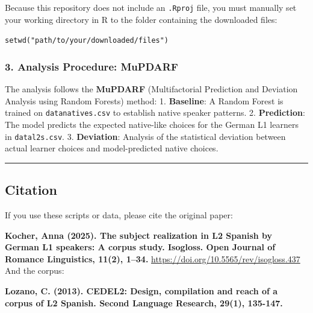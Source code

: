 \documentclass[
  letterpaper,
  DIV=11,
  numbers=noendperiod]{scrartcl}
\begin{document}
Because this repository does not include an \texttt{.Rproj} file, you
must manually set your working directory in R to the folder containing
the downloaded files:

\texttt{setwd("path/to/your/downloaded/files")}

\subsubsection{3. Analysis Procedure:
MuPDARF}\label{analysis-procedure-mupdarf}

The analysis follows the \textbf{MuPDARF} (Multifactorial Prediction and
Deviation Analysis using Random Forests) method: 1. \textbf{Baseline}: A
Random Forest is trained on \texttt{datanatives.csv} to establish native
speaker patterns. 2. \textbf{Prediction}: The model predicts the
expected native-like choices for the German L1 learners in
\texttt{datal2s.csv}. 3. \textbf{Deviation}: Analysis of the statistical
deviation between actual learner choices and model-predicted native
choices.

\begin{center}\rule{0.5\linewidth}{0.5pt}\end{center}

\subsection{Citation}\label{citation}

If you use these scripts or data, please cite the original paper:

\textbf{Kocher, Anna (2025). The subject realization in L2 Spanish by
German L1 speakers: A corpus study. Isogloss. Open Journal of Romance
Linguistics, 11(2), 1--34.}
\url{https://doi.org/10.5565/rev/isogloss.437} And the corpus:

\textbf{Lozano, C. (2013). CEDEL2: Design, compilation and reach of a
corpus of L2 Spanish. Second Language Research, 29(1), 135-147.}
\end{document}
